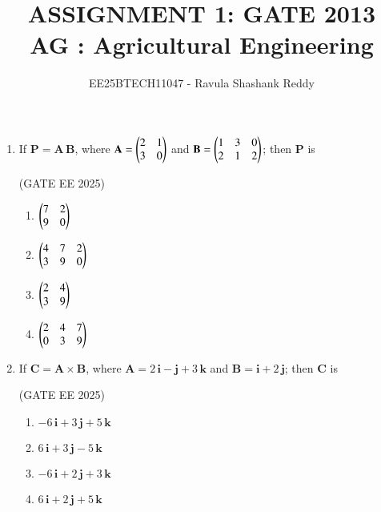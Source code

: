 \documentclass[journal,12pt,onecolumn]{IEEEtran}
\theoremstyle{remark}
\begin{document}
\title{
ASSIGNMENT 1: GATE 2013 \\
AG : Agricultural Engineering}
\author{EE25BTECH11047 - Ravula Shashank Reddy}
\maketitle
\renewcommand{\thefigure}{\theenumi}
\renewcommand{\thetable}{\theenumi}



\begin{enumerate}

\item If $\mathbf P = \mathbf A\,\mathbf B$, where $\displaystyle \mathbf A = \begin{pmatrix}2 & 1 \\ 3 & 0\end{pmatrix}$ and $\displaystyle \mathbf B = \begin{pmatrix}1 & 3 & 0 \\ 2 & 1 & 2\end{pmatrix}$; then $\mathbf P$ is\

\hfill(GATE EE 2025)

\begin{multicols}{4}
\begin{enumerate}
    \item $\begin{pmatrix}7 & 2\\ 9 & 0\end{pmatrix}$
    \item $\begin{pmatrix}4 & 7 & 2\\ 3 & 9 & 0\end{pmatrix}$ 
    \item $\begin{pmatrix}2 & 4\\ 3 & 9\end{pmatrix}$ 
    \item $\begin{pmatrix}2 & 4 & 7\\ 0 & 3 & 9\end{pmatrix}$
\end{enumerate}
\end{multicols}

\item If $\mathbf C = \mathbf A \times \mathbf B$, where $\mathbf A = 2\,\mathbf i - \mathbf j + 3\,\mathbf k$ and $\mathbf B = \mathbf i + 2\,\mathbf j$; then $\mathbf C$ is\

\hfill(GATE EE 2025)

\begin{multicols}{4}
\begin{enumerate}
    \item  $-6\,\mathbf i + 3\,\mathbf j + 5\,\mathbf k$ 
    \item  $6\,\mathbf i + 3\,\mathbf j - 5\,\mathbf k$ 
    \item $-6\,\mathbf i + 2\,\mathbf j + 3\,\mathbf k$ 
    \item $6\,\mathbf i + 2\,\mathbf j + 5\,\mathbf k$
\end{enumerate}
\end{multicols}


\end{enumerate}
\end{document}

